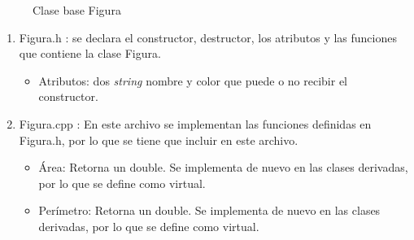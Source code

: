 \documentclass[11pt]{article}
\begin{document}
\begin{figure}[H]
\centering
{}
\caption{Clase base Figura}
\label{fig:base}
\end{figure}

\newpage
\begin{enumerate}

\item Figura.h : se declara el constructor, destructor, los atributos y las funciones que contiene la clase Figura.

  \begin{itemize}
  \item Atributos: dos \textit{string} nombre y color que puede o no recibir el constructor.
  \end{itemize}

\item Figura.cpp : En este archivo se implementan las funciones definidas en Figura.h, por lo que se tiene que incluir en este archivo.
 
 \begin{itemize}
   \item Área: Retorna un double. Se implementa de nuevo en las clases derivadas, por lo que se define como virtual.
   \item Perímetro: Retorna un double. Se implementa de nuevo en las clases derivadas, por lo que se define como virtual.
  \end{itemize}

\end{enumerate}
\end{document}
